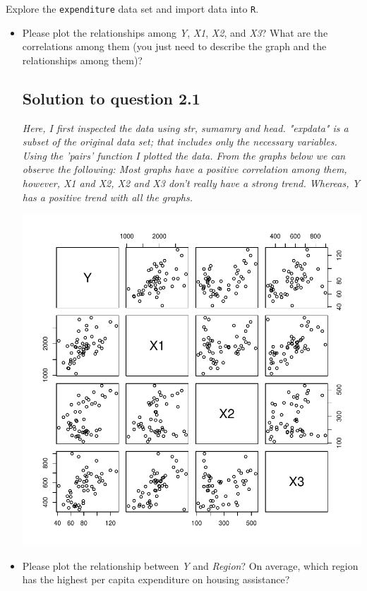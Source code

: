 \documentclass[12pt,letterpaper]{article}
\begin{document}
\vspace{.5cm}
\noindent Explore the \texttt{expenditure} data set and import data into \texttt{R}.
\vspace{.5cm}
\vspace{.5cm}
\begin{itemize}

\item
Please plot the relationships among \emph{Y}, \emph{X1}, \emph{X2}, and \emph{X3}? What are the correlations among them (you just need to describe the graph and the relationships among them)?
\subsection*{Solution to question 2.1}
  
\textit{Here, I first inspected the data using str, sumamry and head. "expdata" is a subset of the original data set; that includes only the necessary variables. Using the 'pairs' function I plotted the data. From the graphs below we can observe the following: Most graphs have a positive correlation among them, however, X1 and X2, X2 and X3 don't really have a strong trend. Whereas, Y has a positive trend with all the graphs. }

{\centering
\includegraphics[width=\textwidth]{Question2.1.pdf}\par}
\vspace{.5cm}
\item
Please plot the relationship between \emph{Y} and \emph{Region}? On average, which region has the highest per capita expenditure on housing assistance?


\end{itemize}
\end{document}
